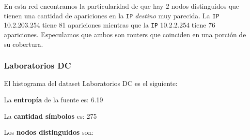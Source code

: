 En esta red encontramos la particularidad de que hay 2 nodos distinguidos que tienen
una cantidad de apariciones en la \texttt{IP} \textit{destino} muy parecida.
La \texttt{IP} 10.2.203.254 tiene 81 apariciones mientras que la \texttt{IP} 10.2.2.254 tiene 76 apariciones. Especulamos que ambos son routers que coinciden en una porción de su cobertura.

\subsubsection{Laboratorios DC}

El histograma del dataset Laboratorios DC es el siguiente:

\begin{center}
\end{center}

La \textbf{entropía} de la fuente es: 6.19

La \textbf{cantidad símbolos} es: 275

Los \textbf{nodos distinguidos} son:

